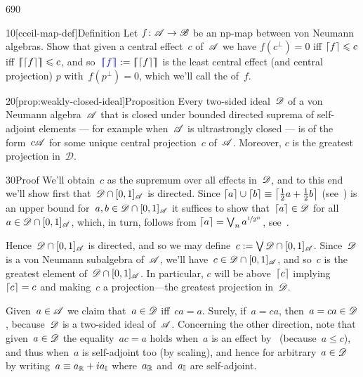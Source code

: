 \begin{parsec}{690}%
\begin{point}{10}[cceil-map-def]{Definition}%
Let $f\colon \mathscr{A}\to\mathscr{B}$
be an np-map
between von Neumann algebras.
Show that given a central effect~$c$
of~$\mathscr{A}$ we have
$f(c^\perp)=0$
iff $\left\lceil f\right\rceil\leqslant c$
iff $\left\lceil\!\!\left\lceil\left\lceil f\right\rceil\right\rceil\!\!\right\rceil\leqslant c$,
and so~$\Define{\cceil{f}}:=\cceil{\ceil{f}}$%
is the least central effect
(and central projection) $p$
with~$f(p^\perp)=0$,
which we'll call the %
of~$f$.
\end{point}
\begin{point}{20}[prop:weakly-closed-ideal]{Proposition}%
Every two-sided ideal~$\mathscr{D}$ of a von Neumann
algebra~$\mathscr{A}$
that is closed under bounded directed suprema of self-adjoint 
elements --- for example when~$\mathscr{A}$ is ultrastrongly closed ---
is of the form~$c\mathscr{A}$
for some unique central projection~$c$ of~$\mathscr{A}$.
Moreover, $c$ is the greatest projection in~$\mathscr{D}$.
\begin{point}{30}{Proof}%
We'll obtain~$c$ as the supremum over all effects in~$\mathscr{D}$,
and to this end we'll show first that~$\mathscr{D}\cap [0,1]_{\mathscr{A}}$
is directed.
Since $\left\lceil a\right\rceil\cup \left\lceil b\right\rceil \equiv \left\lceil\frac{1}{2}a+\frac{1}{2}b\right\rceil$
(see~)
is an upper bound for~$a,b\in\mathscr{D}\cap [0,1]_{\mathscr{A}}$
it suffices to show that~$\left\lceil a\right\rceil\in \mathscr{D}$
for all~$a\in \mathscr{D}\cap[0,1]_{\mathscr{A}}$,
which, in turn,
follows from
$\left\lceil a\right\rceil=\bigvee_n a^{\nicefrac{1}{2^n}}$,
see~.

Hence~$\mathscr{D}\cap [0,1]_{\mathscr{A}}$ is directed,
and so we may define~$c:=\bigvee \mathscr{D}\cap[0,1]_{\mathscr{A}}$.
Since~$\mathscr{D}$ is a von Neumann subalgebra of~$\mathscr{A}$,
we'll have~$c\in\mathscr{D}\cap[0,1]_{\mathscr{A}}$,
and so~$c$ is the greatest element of~$\mathscr{D}\cap[0,1]_{\mathscr{A}}$.
In particular,
$c$ will be above~$\left\lceil c\right\rceil$ implying~$\left\lceil c\right\rceil=c$
and making~$c$ a projection---the greatest projection in~$\mathscr{D}$.

Given~$a\in\mathscr{A}$ we claim that~$a\in \mathscr{D}$
iff~$ca=a$.
Surely, if~$a=ca$,
then~$a=ca\in \mathscr{D}$,
because~$\mathscr{D}$ is a two-sided ideal of~$\mathscr{A}$.
Concerning the other direction,
note that given~$a\in \mathscr{D}$
the equality~$ac=a$ holds
when~$a$ is an effect by~ (because~$a\leq c$),
and thus when~$a$ is self-adjoint too
(by scaling),
and hence for arbitrary~$a\in\mathscr{D}$
by  writing~$a\equiv a_{\mathbb{R}}+ia_{\mathbb{I}}$
where~$a_{\mathbb{R}}$ and~$a_{\mathbb{I}}$ are self-adjoint.


\end{point}
\end{point}
\end{parsec}
